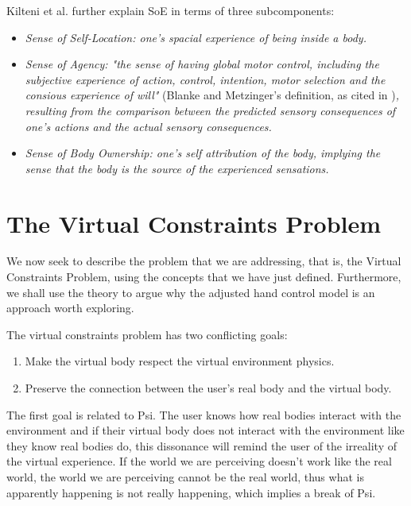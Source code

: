 Kilteni et al. further explain SoE in terms of three subcomponents:

\begin{displayquote}
\begin{itemize}
\item \textit{Sense of Self-Location: one's spacial experience of being inside a body.}
\item \textit{Sense of Agency: "the sense of having global motor control, including the subjective experience of action, control, intention, motor selection and the consious experience of will"} (Blanke and Metzinger's definition, as cited in \parencite{Kilteni2012})\textit{, resulting from the comparison between the predicted sensory consequences of one's actions and the actual sensory consequences.}
\item \textit{Sense of Body Ownership: one's self attribution of the body, implying the sense that the body is the source of the experienced sensations.}
\end{itemize}
\end{displayquote}

\section{The Virtual Constraints Problem}
\label{sec:virtualContraintsProblem}

We now seek to describe the problem that we are addressing, that is, the Virtual Constraints Problem, using the concepts that we have just defined. Furthermore, we shall use the theory to argue why the adjusted hand control model is an approach worth exploring.

The virtual constraints problem has two conflicting goals:

\begin{enumerate}
\item Make the virtual body respect the virtual environment physics.
\item Preserve the connection between the user's real body and the virtual body.
\end{enumerate}

The first goal is related to Psi. The user knows how real bodies interact with the environment and if their virtual body does not interact with the environment like they know real bodies do, this dissonance will remind the user of the irreality of the virtual experience. If the world we are perceiving doesn't work like the real world, the world we are perceiving cannot be the real world, thus what is apparently happening is not really happening, which implies a break of Psi.

